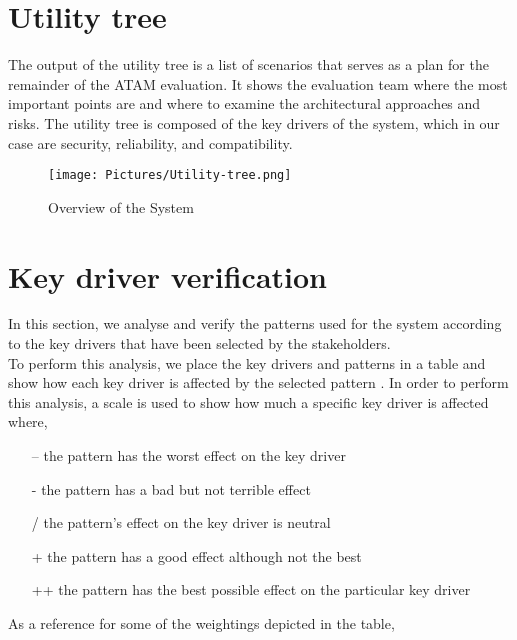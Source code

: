 \section{Utility tree}
The output of the utility tree is a list of scenarios that serves as a plan
for the remainder of the ATAM evaluation. It shows the evaluation team
where the most important points are and where to examine the architectural
approaches and risks. The utility tree is composed of the key drivers of the
system, which in our case are security, reliability, and compatibility.

\begin{figure}[H]
  \centering
  \texttt{[image: Pictures/Utility-tree.png]}
  \caption{Overview of the System}
  \label{fig:system}
\end{figure}

\section{Key driver verification}
In this section, we analyse and verify the patterns used for the system according to the key drivers that have been selected by the stakeholders.\\
To perform this analysis, we place the key drivers and patterns in a table and show how each key driver is affected by the selected pattern \cite{web:patterns-v-QAs} . In order to perform this analysis, a scale is used to show how much a specific key driver is affected where,
\begin{itemize}
  \item[--] the pattern has the worst effect on the key driver
  \item[-] the pattern has a bad but not terrible effect
  \item[/] the pattern's effect on the key driver is neutral
  \item[+] the pattern has a good effect although not the best  
  \item[++] the pattern has the best possible effect on the particular key driver
\end{itemize}
As a reference for some of the weightings depicted in the table, 

